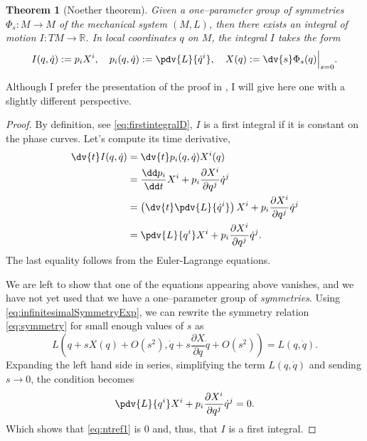 \documentclass[english,fontsize=11pt,paper=b5]{scrbook}
\newtheorem{theorem}{Theorem}[chapter]
\theoremstyle{definition}
\begin{document}
    \begin{theorem}[Noether theorem]\label{thm:noether}
      Given a one--parameter group of symmetries $\Phi_s: M \to M$ of the mechanical system $(M,L)$, then there exists an integral of motion $I: TM \to \mathbb{R}$.
      In local coordinates $q$ on $M$, the integral $I$ takes the form
      \begin{equation}
        I(q,\dot q) := p_i X^i,
        \quad p_i(q, \dot q) := \pdv{L}{\dot q^i},
        \quad X(q) := \dv{s} \Phi_s(q) \Big|_{s=0}.
      \end{equation}
    \end{theorem}

    Although I prefer the presentation of the proof in \cite[Chapter 20.B]{book:arnold}, I will give here one with a slightly different perspective.
    \begin{proof}
      By definition, see \eqref{eq:firstintegralD}, $I$ is a first integral if it is constant on the phase curves.
      Let's compute its time derivative,
      \begin{align}
        \dv{t} I(q, \dot q)
     & = \dv{t} p_i(q, \dot q) X^i(q)                                                                                 \\
     & = \frac{\dd p_i}{\dd t} X^i + p_i \frac{\partial X^i}{\partial q^j} \dot q^j                                              \\
     & = \left(\dv{t}\pdv{L}{\dot q^i}\right) X^i + p_i \frac{\partial X^i}{\partial q^j} \dot q^j \\
     & = \pdv{L}{q^i} X^i + p_i \frac{\partial X^i}{\partial q^j} \dot q^j. \label{eq:ntref1}
      \end{align}
      The last equality follows from the Euler-Lagrange equations.

      We are left to show that one of the equations appearing above vanishes, and we have not yet used that we have a one--parameter group of \emph{symmetries}.
      Using \eqref{eq:infinitesimalSymmetryExp}, we can rewrite the symmetry relation \eqref{eq:symmetry} for small enough values of $s$ as
      \begin{equation}\label{eq:invariance}
        L\left( q + s X(q) + O(s^2), \dot q + s \frac{\partial X}{\partial q} \dot q + O(s^2) \right) = L(q, \dot q).
      \end{equation}
      Expanding the left hand side in series, simplifying the term $L(q, \dot q)$ and sending $s\to 0$, the condition becomes
      \begin{equation}\label{eq:ntref2}
        \pdv{L}{q^i} X^i + p_i \frac{\partial X^i}{\partial q^j} \dot q^j = 0.
      \end{equation}
      Which shows that \eqref{eq:ntref1} is $0$ and, thus, that $I$ is a first integral.
    \end{proof}
\end{document}
